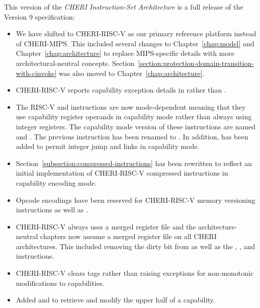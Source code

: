 This version of the \textit{CHERI Instruction-Set Architecture} is a full
release of the Version 9 specification:

\begin{itemize}
\item We have shifted to CHERI-RISC-V as our primary reference
  platform instead of CHERI-MIPS.  This included several changes to
  Chapter~\ref{chap:model} and Chapter~\ref{chap:architecture} to
  replace MIPS-specific details with more architectural-neutral
  concepts.
  Section~\ref{section:protection-domain-transition-with-cinvoke} was
  also moved to Chapter~\ref{chap:architecture}.

\item CHERI-RISC-V reports capability exception details in \xtval{}
  rather than \xccsr{}.

\item The RISC-V  and  instructions are
  now mode-dependent meaning that they use capability register
  operands in capability mode rather than always using integer
  registers.  The capability mode version of these instructions are
  named  and .  The previous
   instruction has been renamed to
  .  In addition,  has been added
  to permit integer jump and links in capability mode.

\item Section~\ref{subsection:compressed-instructions} has been
  rewritten to reflect an initial implementation of CHERI-RISC-V
  compressed instructions in capability encoding mode.

\item Opcode encodings have been reserved for CHERI-RISC-V memory
  versioning instructions as well as .

\item CHERI-RISC-V always uses a merged register file and the
  architecture-neutral chapters now assume a merged register file on
  all CHERI architectures.  This included removing the dirty bit from
  \xccsr{} as well as the , , and
   instructions.

\item CHERI-RISC-V clears tags rather than raising exceptions for
  non-monotonic modifications to capabilities.

\item Added  and  to retrieve and
  modify the upper half of a capability.


\end{itemize}
